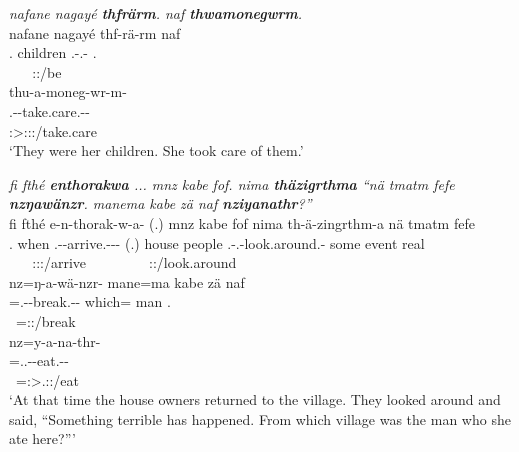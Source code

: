 \begin{exe}
	\ex \textit{nafane nagayé \textbf{thfrärm}. naf \textbf{thwamonegwrm}.}\\
	\glll nafane nagayé thf-rä-rm naf\\
	\Tsg{}.\Poss{} children \Stnsg.\Betatwo-\Cop.\Ndu-\Dur{} \Tsg{}.\Erg{}\\
	~ ~  \Stpl:\Pst:\Dur/be ~\\
	\sn
	\glll thu-a-moneg-wr-m-\Zero{}\\
	\Stnsg.\Betaone-\Vc-take.care.\Ext-\Ndu-\Dur\\
	\Stsg:\Sbj>\Stpl:\Obj:\Pst:\Dur/take.care\\
	\trans `They were her children. She took care of them.' 
	\label{ex006}
\end{exe}
\begin{exe}
	\ex \emph{fi fthé \textbf{enthorakwa} ... mnz kabe fof. nima \textbf{thäzigrthma} ``nä tmatm fefe \textbf{nzŋawänzr}. manema kabe zä naf \textbf{nziyanathr}?''}\\
	\glll fi fthé e-n-thorak-w-a-\Zero{} (.) mnz kabe fof nima th-ä-zingrthm-a nä tmatm fefe\\
	\Third{}.\Abs{} when \Stnsg.\Alph-\Venit-arrive.\Ext-\Ndu-\Pst-\Stsg{} (.) house people \Emph{} \Quot{} \Stnsg.\Gam-\Vc.\Ndu-look.around.\Rs-\Pst{} some event real\\
	~ ~ {\Stpl:\Pst:\Ipfv:\Venit/arrive} ~ ~ ~ ~ ~ {\Stpl:\Pst:\Pfv/look.around} ~ ~ ~\\
	\sn
	\glll nz=ŋ-a-wä-nzr-\Zero{} mane=ma kabe zä naf\\
	\Immpst{}=\M.\Alph-\Vc-break.\Ext-\Ndu-\Stsg{} which=\Char{} man \Prox{} \Tsg{}.\Erg{}\\
	\footnotesize{\Immpst~=\Stsg:\Nonpast:\Ipfv/break} ~ ~ ~ ~\\
	\sn
	\glll nz=y-a-na-thr-\Zero{}\\
	\Immpst{}=\Tsg.\Masc.\Alph-\Vc-eat.\Ext-\Ndu-\Stsg{}\\
	 \footnotesize{\Immpst~=\Stsg:\Sbj>\Tsg.\Masc:\Obj:\Nonpast/eat}\\
	\trans `At that time the house owners returned to the village. They looked around and said, ``Something terrible has happened. From which village was the man who she ate here?''' 
	\label{ex007}
\end{exe}

